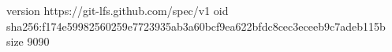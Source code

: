 version https://git-lfs.github.com/spec/v1
oid sha256:f174e59982560259e7723935ab3a60bcf9ea622bfdc8cec3eceeb9c7adeb115b
size 9090
